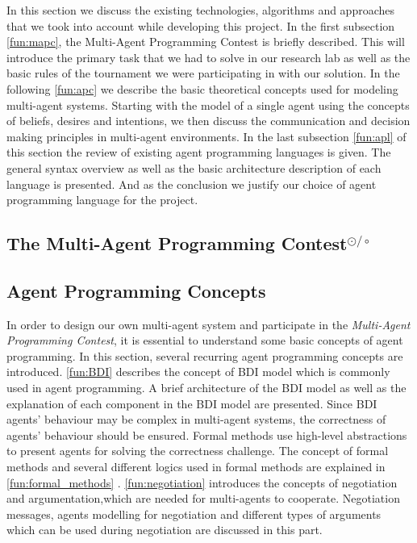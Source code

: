 In this section we discuss the existing technologies, algorithms and approaches that we took into account while developing this project. 
In the first subsection \autoref{fun:mapc}, the Multi-Agent Programming Contest is briefly described. 
This will introduce the primary task that we had to solve in our research lab as well as the basic rules of the tournament we were participating in with our solution.
In the following \autoref{fun:apc} we describe the basic theoretical concepts used for modeling multi-agent systems.
Starting with the model of a single agent using the concepts of beliefs, desires and intentions, we then discuss the communication and decision making principles in multi-agent environments.
In the last subsection \autoref{fun:apl} of this section the review of existing agent programming languages is given.
The general syntax overview as well as the basic architecture description of each language is presented. 
And as the conclusion we justify our choice of agent programming language for the project.

\subsection[The Multi-Agent Programming Contest]{The Multi-Agent Programming Contest$^{\odot/\circ}$}\label{fun:mapc}


\subsection{Agent Programming Concepts}\label{fun:apc}
In order to design our own multi-agent system and participate in the \emph{Multi-Agent Programming Contest}, it is essential to understand some basic concepts of agent programming.
In this section, several recurring agent programming concepts are introduced.
\autoref{fun:BDI} describes the concept of BDI model which is commonly used in agent programming. 
A brief architecture of the BDI model as well as the explanation of each component in the BDI model are presented.
Since BDI agents' behaviour may be complex in multi-agent systems, the correctness of agents’ behaviour should be ensured. 
Formal methods use high-level abstractions to present agents for solving the correctness challenge. The concept of formal methods and several different logics used in formal methods are explained in \autoref{fun:formal_methods} .
\autoref{fun:negotiation} introduces the concepts of negotiation and argumentation,which are needed for multi-agents to cooperate.
Negotiation messages, agents modelling for negotiation and different types of arguments which can be used during negotiation are discussed in this part.

